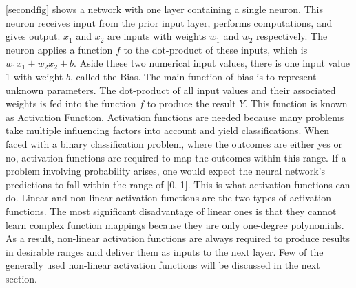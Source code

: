 \documentclass[a4paper,11pt,oneside]{book}
\begin{document}
\autoref{secondfig} shows a network with one layer containing a single neuron. This neuron receives input from the prior input layer, performs computations, and gives output. $x_1$ and $x_2$ are inputs with weights $w_1$ and $w_2$ respectively. The neuron applies a function $f$ to the dot-product of these inputs, which is $w_{1}x_{1}+w_{2}x_{2}+b$.  Aside these two numerical input values, there is one input value 1 with weight $b$, called the Bias. The main function of bias is to represent unknown parameters. The dot-product of all input values and their associated weights is fed into the function $f$ to produce the result $Y$.
This function is known as Activation Function.\newline\newline
Activation functions are needed because many problems take multiple influencing factors into account and yield classifications. When faced with a binary classification problem, where the outcomes are either yes or no, activation functions are required to map the outcomes within this range. If a problem involving probability arises, one would expect the neural network's predictions to fall within the range of [0, 1]. This is what activation functions can do.\newline\newline
Linear and non-linear activation functions are the two types of activation functions. The most significant disadvantage of linear ones is that they cannot learn complex function mappings because they are only one-degree polynomials. As a result, non-linear activation functions are always required to produce results in desirable ranges and deliver them as inputs to the next layer. Few of the generally used non-linear activation functions will be discussed in the next section.
\end{document}
